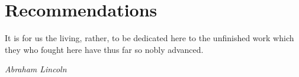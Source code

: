\documentclass[class=report,11pt,crop=false]{standalone}
\begin{document}
\chapter{Recommendations}
\epigraph{It is for us the living, rather, to be dedicated here to the unfinished work which they who fought here have thus far so nobly advanced.}%
    {\emph{Abraham Lincoln}}








\ifstandalone

\printnoidxglossary[type=\acronymtype,nonumberlist]
\fi
\end{document}
